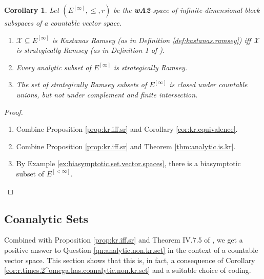 \documentclass[11pt,reqno]{amsart}
\theoremstyle{plain}
\numberwithin{equation}{section}
\newtheorem{corollary}[theorem]{Corollary}
\theoremstyle{definition}
\newcommand{\cal}{\mathcal}
\newcommand{\X}{\cal{X}}
\begin{document}
\begin{corollary}
\label{cor:sr.properties}
    Let $(E^{[\infty]},\leq,r)$ be the \textbf{wA2}-space of infinite-dimensional block subspaces of a countable vector space.
    \begin{enumerate}
        \item\label{cor:kr.iff.sr} $\X \subseteq E^{[\infty]}$ is Kastanas Ramsey (as in Definition \ref{def:kastanas.ramsey}) iff $\X$ is strategically Ramsey (as in Definition 1 of \cite{R08}).

        \item Every analytic subset of $E^{[\infty]}$ is strategically Ramsey.

        \item The set of strategically Ramsey subsets of $E^{[\infty]}$ is closed under countable unions, but not under complement and finite intersection.
    \end{enumerate}
\end{corollary}

\begin{proof}
    \hfill
    \begin{enumerate}
        \item Combine Proposition \ref{prop:kr.iff.sr} and Corollary \ref{cor:kr.equivalence}.

        \item Combine Proposition \ref{prop:kr.iff.sr} and Theorem \ref{thm:analytic.is.kr}.

        \item By Example \ref{ex:biasymptotic.set.vector.spaces}, there is a biasymptotic subset of $E^{[<\infty]}$.
    \end{enumerate}
\end{proof}

\subsection{Coanalytic Sets}
Combined with Proposition \ref{prop:kr.iff.sr} and Theorem IV.7.5 of \cite{AT05}, we get a positive answer to Question \ref{qn:analytic.non.kr.set} in the context of a countable vector space. This section shows that this is, in fact, a consequence of Corollary \ref{cor:r.times.2^omega.has.coanalytic.non.kr.set} and a suitable choice of coding. 
\end{document}
